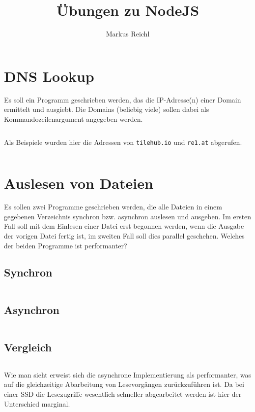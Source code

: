 \documentclass{school}
\title{Übungen zu NodeJS}
\author{Markus Reichl}
\begin{document}
\maketitle
\thispagestyle{fancy}	%

\tableofcontents

\section{DNS Lookup}
Es soll ein Programm geschrieben werden, das die IP-Adresse(n) einer Domain ermittelt und ausgiebt. Die Domains (beliebig viele) sollen dabei als Kommandozeilenargument angegeben werden.

\inputminted{javascript}{1-dnslookup/dnslookup.js}

Als Beispiele wurden hier die Adressen von \texttt{tilehub.io} und \texttt{re1.at} abgerufen.

\inputminted{bash}{1-dnslookup/sample.txt}

\newpage
\section{Auslesen von Dateien}
Es sollen zwei Programme geschrieben werden, die alle Dateien in einem gegebenen Verzeichnis synchron bzw. asynchron auslesen und ausgeben. Im ersten Fall soll mit dem Einlesen einer Datei erst begonnen werden, wenn die Ausgabe der vorigen Datei fertig ist, im zweiten Fall soll dies parallel geschehen. Welches der beiden Programme ist performanter?

\subsection{Synchron}
\inputminted{javascript}{2-read/read-sync.js}

\subsection{Asynchron}
\inputminted{javascript}{2-read/read-async.js}

\subsection{Vergleich}
\inputminted{bash}{2-read/sample.txt}

Wie man sieht erweist sich die asynchrone Implementierung als performanter, was auf die gleichzeitige Abarbeitung von Lesevorgängen zurückzuführen ist. Da bei einer SSD die Lesezugriffe wesentlich schneller abgearbeitet werden ist hier der Unterschied marginal.
\end{document}
